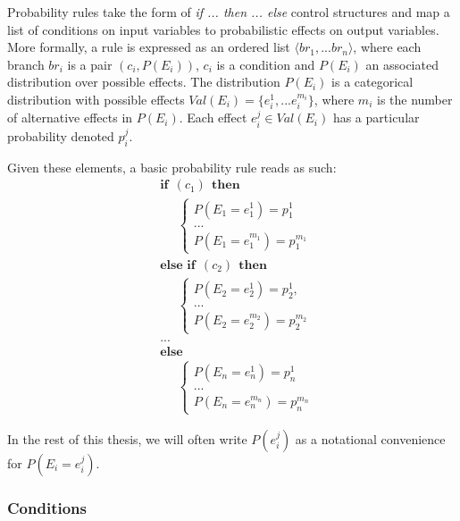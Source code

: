 Probability rules take the form of \textit{if ... then ... else} control structures and map a list of conditions on input variables to probabilistic effects on output variables. More formally, a rule is expressed as an ordered list $\langle br_1, ... br_{n}\rangle$, where each branch $br_i$ is a pair $(c_i, P(E_i))$, $c_i$ is a condition and $P(E_i)$ an associated distribution over possible effects.  The distribution $P(E_i)$ is a categorical distribution with possible effects $Val(E_i) = \{e_i^1,... e_i^{m_i}\}$, where $m_i$ is the number of alternative effects in $P(E_i)$.  Each effect $e_i^j \in Val(E_i)$ has a particular probability denoted $p_i^j$. 

Given these elements, a basic probability rule reads as such:
\begin{equation}
\begin{aligned}
& \textbf{if} \ \ (c_{1}) \ \ \textbf{then} \\ 
& \;\;\;\;\; \begin{cases}
P(E_1\!=\!e_1^1) = p_1^1 \\
 ... \\
P(E_1\!=\!e_1^{m_1}) = p_1^{m_1} 
\end{cases} \\[3mm]
& \textbf{else if} \ \ (c_{2}) \ \ \textbf{then} \\ 
& \;\;\;\;\; \begin{cases}
P(E_2\!=\!e_2^1) = p_2^1, \\
 ... \\
P(E_2\!=\!e_2^{m_2}) = p_2^{m_2}
\end{cases} \\ 
& ...  \\
& \textbf{else} \\
& \;\;\;\;\; \begin{cases}
P(E_{n}\!=\!e_{n}^1) = p_{n}^1 \\
... \\
P(E_{n}\!=\!e_{n}^{m_{n}}) = p_{n}^{m_{n}}
\end{cases}
\end{aligned}
\label{eq:probrule}
\end{equation}

 In the rest of this thesis, we will often write $P(e_i^j)$ as a notational convenience for $P(E_i = e_i^j)$.   


\subsubsection*{Conditions}

